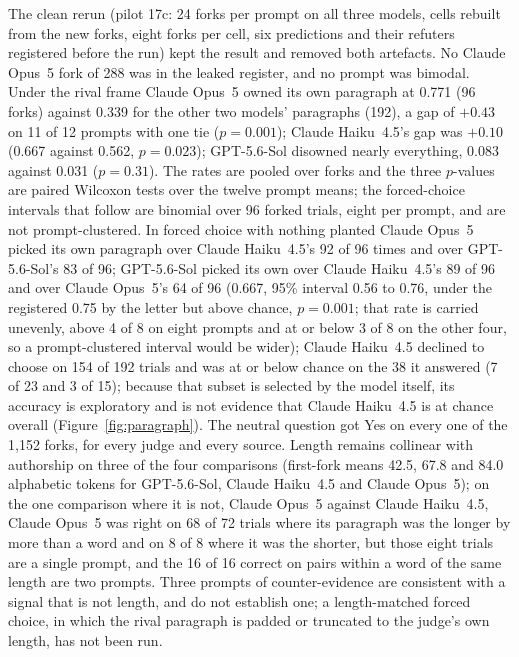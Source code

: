 \documentclass[twocolumn,10pt]{article}
\newcommand{\opus}{Claude Opus~5}
\newcommand{\haiku}{Claude Haiku~4.5}
\newcommand{\gpt}{GPT-5.6-Sol}
\begin{document}
The clean rerun (pilot 17c: 24 forks per prompt on all three models, cells rebuilt from the new forks, eight forks per cell, six predictions and their refuters registered before the run) kept the result and removed both artefacts. No \opus{} fork of 288 was in the leaked register, and no prompt was bimodal. Under the rival frame \opus{} owned its own paragraph at 0.771 (96 forks) against 0.339 for the other two models' paragraphs (192), a gap of $+0.43$ on 11 of 12 prompts with one tie ($p=0.001$); \haiku{}'s gap was $+0.10$ (0.667 against 0.562, $p=0.023$); \gpt{} disowned nearly everything, 0.083 against 0.031 ($p=0.31$). The rates are pooled over forks and the three $p$-values are paired Wilcoxon tests over the twelve prompt means; the forced-choice intervals that follow are binomial over 96 forked trials, eight per prompt, and are not prompt-clustered. In forced choice with nothing planted \opus{} picked its own paragraph over \haiku{}'s 92 of 96 times and over \gpt{}'s 83 of 96; \gpt{} picked its own over \haiku{}'s 89 of 96 and over \opus{}'s 64 of 96 (0.667, 95\% interval 0.56 to 0.76, under the registered 0.75 by the letter but above chance, $p=0.001$; that rate is carried unevenly, above 4 of 8 on eight prompts and at or below 3 of 8 on the other four, so a prompt-clustered interval would be wider); \haiku{} declined to choose on 154 of 192 trials and was at or below chance on the 38 it answered (7 of 23 and 3 of 15); because that subset is selected by the model itself, its accuracy is exploratory and is not evidence that \haiku{} is at chance overall (Figure~\ref{fig:paragraph}). The neutral question got Yes on every one of the 1,152 forks, for every judge and every source. Length remains collinear with authorship on three of the four comparisons (first-fork means 42.5, 67.8 and 84.0 alphabetic tokens for \gpt{}, \haiku{} and \opus{}); on the one comparison where it is not, \opus{} against \haiku{}, \opus{} was right on 68 of 72 trials where its paragraph was the longer by more than a word and on 8 of 8 where it was the shorter, but those eight trials are a single prompt, and the 16 of 16 correct on pairs within a word of the same length are two prompts. Three prompts of counter-evidence are consistent with a signal that is not length, and do not establish one; a length-matched forced choice, in which the rival paragraph is padded or truncated to the judge's own length, has not been run.
\end{document}
